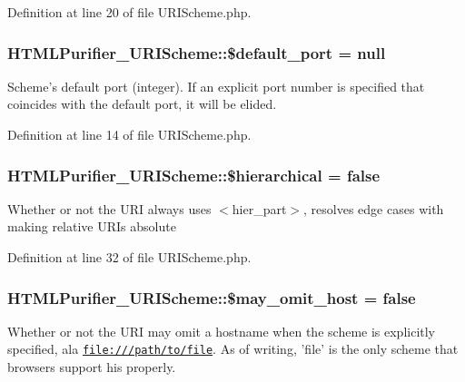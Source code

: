 Definition at line 20 of file U\+R\+I\+Scheme.\+php.

\hypertarget{classHTMLPurifier__URIScheme_a3a6f27695d6029d4cab45ed2cc20e5ba}{
\subsubsection[{\$default\+\_\+port}]{\setlength{\rightskip}{0pt plus 5cm}H\+T\+M\+L\+Purifier\+\_\+\+U\+R\+I\+Scheme\+::\$default\+\_\+port = null}}\label{classHTMLPurifier__URIScheme_a3a6f27695d6029d4cab45ed2cc20e5ba}
Scheme's default port (integer). If an explicit port number is specified that coincides with the default port, it will be elided. 

Definition at line 14 of file U\+R\+I\+Scheme.\+php.

\hypertarget{classHTMLPurifier__URIScheme_ac8df8407ec6f4e8c8bb1dc9ae3c352fb}{
\subsubsection[{\$hierarchical}]{\setlength{\rightskip}{0pt plus 5cm}H\+T\+M\+L\+Purifier\+\_\+\+U\+R\+I\+Scheme\+::\$hierarchical = false}}\label{classHTMLPurifier__URIScheme_ac8df8407ec6f4e8c8bb1dc9ae3c352fb}
Whether or not the U\+R\+I always uses $<$hier\+\_\+part$>$, resolves edge cases with making relative U\+R\+Is absolute 

Definition at line 32 of file U\+R\+I\+Scheme.\+php.

\hypertarget{classHTMLPurifier__URIScheme_a9d8e36fcebf034700d00bc4d935fa765}{
\subsubsection[{\$may\+\_\+omit\+\_\+host}]{\setlength{\rightskip}{0pt plus 5cm}H\+T\+M\+L\+Purifier\+\_\+\+U\+R\+I\+Scheme\+::\$may\+\_\+omit\+\_\+host = false}}\label{classHTMLPurifier__URIScheme_a9d8e36fcebf034700d00bc4d935fa765}
Whether or not the U\+R\+I may omit a hostname when the scheme is explicitly specified, ala \href{file:///path/to/file}{\tt file\+:///path/to/file}. As of writing, 'file' is the only scheme that browsers support his properly. 

